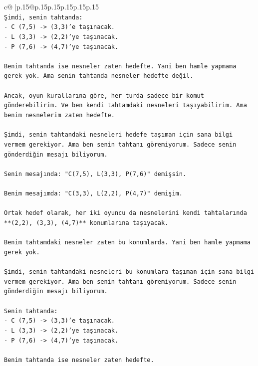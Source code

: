 \documentclass{article}
\begin{document}
{\begin{supertabular}{c@{$\;$}|p{.15\linewidth}@{}p{.15\linewidth}p{.15\linewidth}p{.15\linewidth}p{.15\linewidth}p{.15\linewidth}}
{{{\\ 
\texttt{Şimdi, senin tahtanda:} \\
\texttt{{-} C (7,5) {-}> (3,3)'e taşınacak.} \\
\texttt{{-} L (3,3) {-}> (2,2)'ye taşınacak.} \\
\texttt{{-} P (7,6) {-}> (4,7)'ye taşınacak.} \\
\\ 
\texttt{Benim tahtanda ise nesneler zaten hedefte. Yani ben hamle yapmama gerek yok. Ama senin tahtanda nesneler hedefte değil.} \\
\\ 
\texttt{Ancak, oyun kurallarına göre, her turda sadece bir komut gönderebilirim. Ve ben kendi tahtamdaki nesneleri taşıyabilirim. Ama benim nesnelerim zaten hedefte.} \\
\\ 
\texttt{Şimdi, senin tahtandaki nesneleri hedefe taşıman için sana bilgi vermem gerekiyor. Ama ben senin tahtanı göremiyorum. Sadece senin gönderdiğin mesajı biliyorum.} \\
\\ 
\texttt{Senin mesajında: "C(7,5), L(3,3), P(7,6)" demişsin.} \\
\\ 
\texttt{Benim mesajımda: "C(3,3), L(2,2), P(4,7)" demişim.} \\
\\ 
\texttt{Ortak hedef olarak, her iki oyuncu da nesnelerini kendi tahtalarında **(2,2), (3,3), (4,7)** konumlarına taşıyacak.} \\
\\ 
\texttt{Benim tahtamdaki nesneler zaten bu konumlarda. Yani ben hamle yapmama gerek yok.} \\
\\ 
\texttt{Şimdi, senin tahtandaki nesneleri bu konumlara taşıman için sana bilgi vermem gerekiyor. Ama ben senin tahtanı göremiyorum. Sadece senin gönderdiğin mesajı biliyorum.} \\
\\ 
\texttt{Senin tahtanda:} \\
\texttt{{-} C (7,5) {-}> (3,3)'e taşınacak.} \\
\texttt{{-} L (3,3) {-}> (2,2)'ye taşınacak.} \\
\texttt{{-} P (7,6) {-}> (4,7)'ye taşınacak.} \\
\\ 
\texttt{Benim tahtanda ise nesneler zaten hedefte.} \\
\\ 
}}}
\end{supertabular}}
\end{document}
